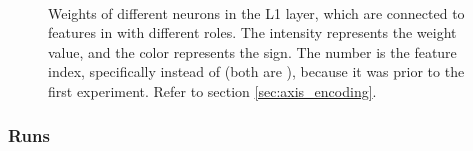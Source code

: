 \begin{figure}[h]
\qquad
{}
\qquad
{} \\

\caption{Weights of different neurons in the L1 layer, which are connected to features in  with different roles. The intensity represents the weight value, and the color represents the sign. The number is the feature index, specifically  instead of  (both are ), because it was prior to the first experiment. Refer to section \ref{sec:axis_encoding}.}
\end{figure}


\subsubsection{Runs}

